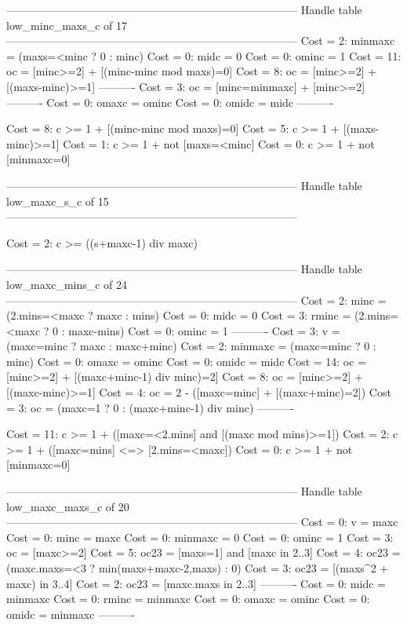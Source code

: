 --------------------------------------------------------------------------------
Handle table low_minc_maxs_c of 17
--------------------------------------------------------------------------------
Cost =  2:  minmaxc = (maxs=<minc ? 0 : minc)
Cost =  0:  midc    = 0
Cost =  0:  ominc   = 1
Cost = 11:  oc      = [minc>=2] + [(minc-minc mod maxs)=0]
Cost =  8:  oc      = [minc>=2] + [(maxs-minc)>=1]
----------
Cost =  3:  oc      = [minc=minmaxc] + [minc>=2]
----------
Cost =  0:  omaxc   = ominc
Cost =  0:  omidc   = midc
----------

Cost =  8:  c >= 1 + [(minc-minc mod maxs)=0]
Cost =  5:  c >= 1 + [(maxs-minc)>=1]
Cost =  1:  c >= 1 + not [maxs=<minc]
Cost =  0:  c >= 1 + not [minmaxc=0]

--------------------------------------------------------------------------------
Handle table low_maxc_s_c of 15
--------------------------------------------------------------------------------

Cost =  2:  c >= ((s+maxc-1) div maxc)

--------------------------------------------------------------------------------
Handle table low_maxc_mins_c of 24
--------------------------------------------------------------------------------
Cost =  2:  minc    = (2.mins=<maxc ? maxc : mins)
Cost =  0:  midc    = 0
Cost =  3:  rminc   = (2.mins=<maxc ? 0 : maxc-mins)
Cost =  0:  ominc   = 1
----------
Cost =  3:  v       = (maxc=minc ? maxc : maxc+minc)
Cost =  2:  minmaxc = (maxc=minc ? 0 : minc)
Cost =  0:  omaxc   = ominc
Cost =  0:  omidc   = midc
Cost = 14:  oc      = [minc>=2] + [(maxc+minc-1) div minc)=2]
Cost =  8:  oc      = [minc>=2] + [(maxc-minc)>=1]
Cost =  4:  oc      = 2 - ([maxc=minc] + [(maxc+minc)=2])
Cost =  3:  oc      = (maxc=1 ? 0 : (maxc+minc-1) div minc)
----------

Cost = 11:  c >= 1 + ([maxc=<2.mins] and [(maxc mod mins)>=1])
Cost =  2:  c >= 1 + ([maxc=mins] <=> [2.mins=<maxc])
Cost =  0:  c >= 1 + not [minmaxc=0]

--------------------------------------------------------------------------------
Handle table low_maxc_maxs_c of 20
--------------------------------------------------------------------------------
Cost =  0:  v       = maxc
Cost =  0:  minc    = maxc
Cost =  0:  minmaxc = 0
Cost =  0:  ominc   = 1
Cost =  3:  oc      = [maxc>=2]
Cost =  5:  oc23    = [maxs=1] and [maxc in 2..3]
Cost =  4:  oc23    = (maxc.maxs=<3 ? min(maxs+maxc-2,maxs) : 0)
Cost =  3:  oc23    = [(maxs^2 + maxc) in 3..4]
Cost =  2:  oc23    = [maxc.maxs in 2..3]
----------
Cost =  0:  midc    = minmaxc
Cost =  0:  rminc   = minmaxc
Cost =  0:  omaxc   = ominc
Cost =  0:  omidc   = minmaxc
----------

